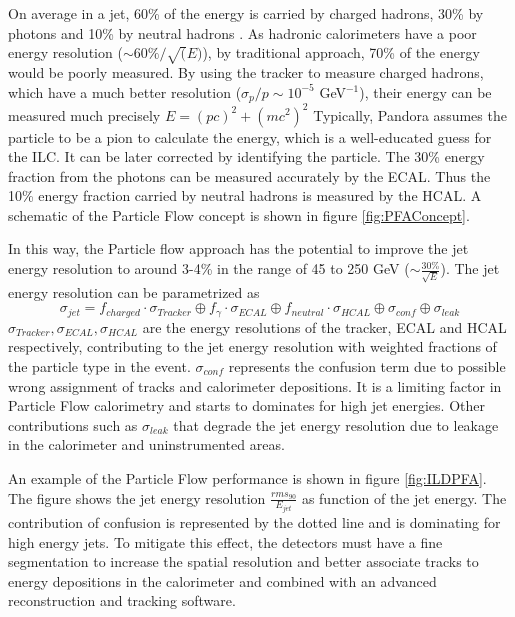 On average in a jet, 60\% of the energy is carried by charged hadrons, 30\% by photons and 10\% by neutral hadrons \cite{Ebrahimi:394104}. As hadronic calorimeters have a poor energy resolution ($\sim 60\%/\sqrt(E)$), by traditional approach, 70\% of the energy would be poorly measured. By using the tracker to measure charged hadrons, which have a much better resolution ($\sigma_p/p \sim 10^{-5}$ GeV$^{-1}$), their energy can be measured much precisely $E = (pc)^2 + (mc^2)^2$ Typically, Pandora assumes the particle to be a pion to calculate the energy, which is a well-educated guess for the ILC. It can be later corrected by identifying the particle. The 30\% energy fraction from the photons can be measured accurately by the ECAL. Thus the 10\% energy fraction carried by neutral hadrons is measured by the HCAL. A schematic of the Particle Flow concept is shown in figure \ref{fig:PFAConcept}.

In this way, the Particle flow approach has the potential to improve the jet energy resolution to around 3-4\% in the range of 45 to 250 GeV ($\sim \frac{30\%}{\sqrt{E}}$). The jet energy resolution can be parametrized as
\begin{equation}
  \sigma_{jet} = f_{charged} \cdot \sigma_{Tracker} \oplus f_{\gamma} \cdot \sigma_{ECAL} \oplus f_{neutral} \cdot \sigma_{HCAL} \oplus \sigma_{conf} \oplus \sigma_{leak}
\end{equation}
$\sigma_{Tracker}, \sigma_{ECAL}, \sigma_{HCAL}$ are the energy resolutions of the tracker, ECAL and HCAL respectively, contributing to the jet energy resolution with weighted fractions of the particle type in the event. $\sigma_{conf}$ represents the confusion term due to possible wrong assignment of tracks and calorimeter depositions. It is a limiting factor in Particle Flow calorimetry and starts to dominates for high jet energies. Other contributions such as $\sigma_{leak}$ that degrade the jet energy resolution due to leakage in the calorimeter and uninstrumented areas.

An example of the Particle Flow performance is shown in figure \ref{fig:ILDPFA}. The figure shows the jet energy resolution $\frac{rms_{90}}{E_{jet}}$ as function of the jet energy. The contribution of confusion is represented by the dotted line and is dominating for high energy jets. To mitigate this effect, the detectors must have a fine segmentation to increase the spatial resolution and better associate tracks to energy depositions in the calorimeter and combined with an advanced reconstruction and tracking software.

